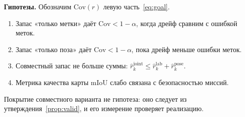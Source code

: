 \textbf{Гипотезы.} Обозначим $\mathrm{Cov}(r)$ левую часть~\eqref{eq:goal}.
\begin{enumerate}[label=H\arabic*., nosep]
  \item Запас «только метки» даёт $\mathrm{Cov} < 1 - \alpha$, когда дрейф сравним с ошибкой меток.
  \item Запас «только поза» даёт $\mathrm{Cov} < 1 - \alpha$, пока дрейф меньше ошибки меток.
  \item Совместный запас не больше суммы: $\hat r^{\mathrm{joint}}_k \le \hat r^{\mathrm{lab}}_k + \hat r^{\mathrm{pose}}_k$.
  \item Метрика качества карты mIoU слабо связана с безопасностью миссий.
\end{enumerate}
Покрытие совместного варианта не гипотеза: оно следует из утверждения~\ref{prop:valid}, и его измерение проверяет реализацию.
